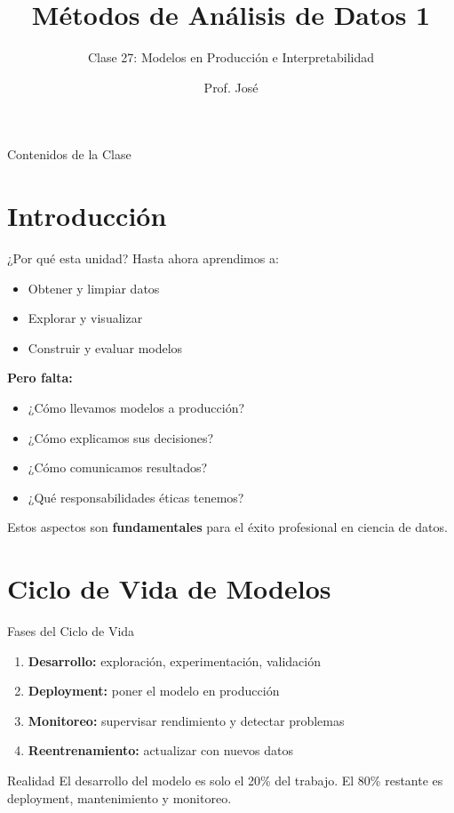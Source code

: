 \documentclass[aspectratio=169]{beamer}
\title[MAD1 - Clase 27]{Métodos de Análisis de Datos 1}
\subtitle{Clase 27: Modelos en Producción e Interpretabilidad}
\author{Prof. José}
\institute{Departamento de Matemática \\ Universidad Nacional del Sur}
\date{}
\begin{document}
\begin{frame}
\titlepage
\end{frame}

\begin{frame}{Contenidos de la Clase}
\tableofcontents
\end{frame}

\section{Introducción}

\begin{frame}{¿Por qué esta unidad?}
Hasta ahora aprendimos a:
\begin{itemize}
\item Obtener y limpiar datos
\item Explorar y visualizar
\item Construir y evaluar modelos
\end{itemize}

\vspace{0.3cm}

\textbf{Pero falta:}
\begin{itemize}
\item ¿Cómo llevamos modelos a producción?
\item ¿Cómo explicamos sus decisiones?
\item ¿Cómo comunicamos resultados?
\item ¿Qué responsabilidades éticas tenemos?
\end{itemize}

\vspace{0.3cm}

Estos aspectos son \textbf{fundamentales} para el éxito profesional en ciencia de datos.
\end{frame}

\section{Ciclo de Vida de Modelos}

\begin{frame}{Fases del Ciclo de Vida}
\begin{enumerate}
\item \textbf{Desarrollo:} exploración, experimentación, validación
\item \textbf{Deployment:} poner el modelo en producción
\item \textbf{Monitoreo:} supervisar rendimiento y detectar problemas
\item \textbf{Reentrenamiento:} actualizar con nuevos datos
\end{enumerate}

\vspace{0.3cm}

\begin{block}{Realidad}
El desarrollo del modelo es solo el 20\% del trabajo. El 80\% restante es deployment, mantenimiento y monitoreo.
\end{block}
\end{frame}
\end{document}
